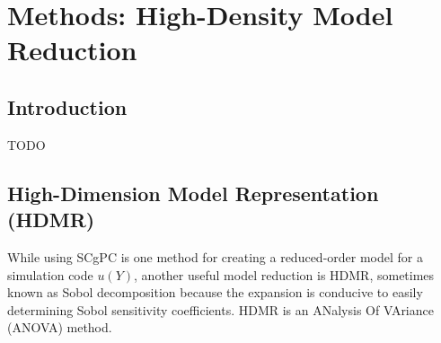 
\chapter{Methods: High-Density Model Reduction} %

\label{ch:methods hdmr} %



\section{Introduction}
TODO



\section{High-Dimension Model Representation (HDMR)}
While using SCgPC is one method for creating a reduced-order model for a simulation code $u(Y)$, another
useful model reduction is HDMR\cite{hdmr}, sometimes known as Sobol decomposition because the expansion is
conducive to easily determining Sobol sensitivity coefficients.  HDMR is an ANalysis Of VAriance (ANOVA)
method.

